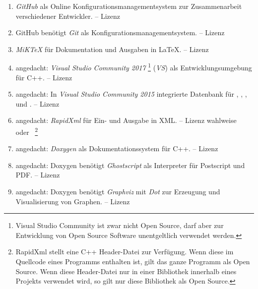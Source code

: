 \begin{enumerate}
	\setcounter{enumi}{\value{Enumi}}%
	
	\item\label{Werkzeug:GitHub}\emph{GitHub}
	als Online Konfigurationsmanagementsystem
	zur Zusammenarbeit verschiedener Entwickler.
	-- Lizenz \seename~\cite{bib:GPLii}
	
	\item\label{Werkzeug:Git}GitHub benötigt
	\emph{Git} als Konfigurationsmanagementsystem.
	-- Lizenz \seename~\cite{bib:GPLii}
	
	\item\label{Werkzeug:MiKTeX}\emph{MiK\TeX}
	für Dokumentation und Ausgaben in \LaTeX.
	-- Lizenz \seename~\cite{bib:MiKTeX}
	
	\item\label{Werkzeug:VSC}angedacht: \emph{Visual Studio Community 2017}%
	\footnote{%
		Visual Studio Community ist zwar nicht Open Source,
		darf aber zur Entwicklung von Open Source Software
		unentgeltlich verwendet werden.%
	}
	(\emph{VS}) als Entwicklungsumgebung für C++.
	-- Lizenz \seename~\cite{bib:EULA}
	
	\item\label{Werkzeug:VSC DB}angedacht: In \emph{Visual Studio Community 2015}
	integrierte Datenbank für , , ,
	 und .
	-- Lizenz \seename~\cite{bib:EULA}
	
	\item\label{Werkzeug:RapidXml}angedacht: \emph{RapidXml}
	für Ein- und Ausgabe in XML.
	-- Lizenz \seename{} wahlweise~\cite{bib:BSLi} oder~\cite{bib:MIT}
	\footnote{%
		RapidXml stellt eine C++ Header-Datei zur Verfügung.
		Wenn diese im Quellcode eines Programms enthalten ist,
		gilt das ganze Programm als Open Source.
		Wenn diese Header-Datei nur
		in einer Bibliothek innerhalb eines Projekts verwendet wird,
		so gilt nur diese Bibliothek als Open Source.%
	}
	
	\item\label{Werkzeug:Doxygen}angedacht: \emph{Doxygen}
	als Dokumentationssystem für C++.
	-- Lizenz \seename~\cite{bib:GPLii}
	
	\item\label{Werkzeug:Ghostscript}angedacht: Doxygen benötigt \emph{Ghostscript}
	als Interpreter für Postscript und PDF.
	-- Lizenz \seename~\cite{bib:AGPL}
	
	\item\label{Werkzeug:Graphviz}angedacht: Doxygen
	benötigt \emph{Graphviz} mit \emph{Dot}
	zur Erzeugung und Visualisierung von Graphen.
	-- Lizenz \seename~\cite{bib:EPL}
	
	\setcounter{Enumi}{\value{enumi}}%
\end{enumerate}

